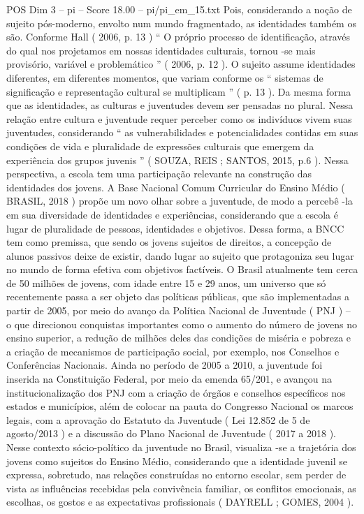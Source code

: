 \begin{textsample}{POS Dim 3 – pi – Score 18.00 – pi/pi\_em\_15.txt}
Pois, considerando a noção de sujeito pós-moderno, envolto num mundo fragmentado, as identidades também os são.
Conforme Hall ( 2006, p. 13 ) “ O próprio processo de identificação, através do qual nos projetamos em nossas identidades culturais, tornou -se mais provisório, variável e problemático ” ( 2006, p. 12 ).
O sujeito assume identidades diferentes, em diferentes momentos, que variam conforme os “ sistemas de significação e representação cultural se multiplicam ” ( p. 13 ).
Da mesma forma que as identidades, as culturas e juventudes devem ser pensadas no plural.
Nessa relação entre cultura e juventude requer perceber como os indivíduos vivem suas juventudes, considerando “ as vulnerabilidades e potencialidades contidas em suas condições de vida e pluralidade de expressões culturais que emergem da experiência dos grupos juvenis ” ( SOUZA, REIS ; SANTOS, 2015, p.6 ).
Nessa perspectiva, a escola tem uma participação relevante na construção das identidades dos jovens.
A Base Nacional Comum Curricular do Ensino Médio ( BRASIL, 2018 ) propõe um novo olhar sobre a juventude, de modo a percebê -la em sua diversidade de identidades e experiências, considerando que a escola é lugar de pluralidade de pessoas, identidades e objetivos.
Dessa forma, a BNCC tem como premissa, que sendo os jovens sujeitos de direitos, a concepção de alunos passivos deixe de existir, dando lugar ao sujeito que protagoniza seu lugar no mundo de forma efetiva com objetivos factíveis.
O Brasil atualmente tem cerca de 50 milhões de jovens, com idade entre 15 e 29 anos, um universo que só recentemente passa a ser objeto das políticas públicas, que são implementadas a partir de 2005, por meio do avanço da Política Nacional de Juventude ( PNJ ) – o que direcionou conquistas importantes como o aumento do número de jovens no ensino superior, a redução de milhões deles das condições de miséria e pobreza e a criação de mecanismos de participação social, por exemplo, nos Conselhos e Conferências Nacionais.
Ainda no período de 2005 a 2010, a juventude foi inserida na Constituição Federal, por meio da emenda 65/201, e avançou na institucionalização dos PNJ com a criação de órgãos e conselhos específicos nos estados e municípios, além de colocar na pauta do Congresso Nacional os marcos legais, com a aprovação do Estatuto da Juventude ( Lei 12.852 de 5 de agosto/2013 ) e a discussão do Plano Nacional de Juventude ( 2017 a 2018 ).
Nesse contexto sócio-político da juventude no Brasil, visualiza -se a trajetória dos jovens como sujeitos do Ensino Médio, considerando que a identidade juvenil se expressa, sobretudo, nas relações construídas no entorno escolar, sem perder de vista as influências recebidas pela convivência familiar, os conflitos emocionais, as escolhas, os gostos e as expectativas profissionais ( DAYRELL ; GOMES, 2004 ).

\end{textsample}
